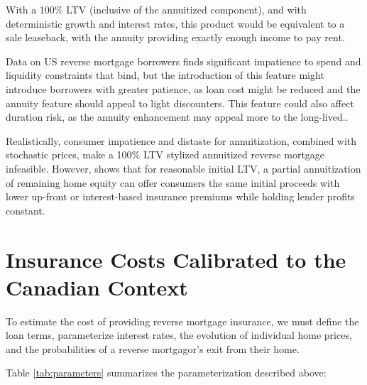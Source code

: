 \documentclass[12pt]{article}
\begin{document}
With a 100\% LTV (inclusive of the annuitized component), and with
deterministic growth and interest rates, this product would be equivalent to a
sale leaseback, with the annuity providing exactly enough income to pay rent.

Data on US reverse mortgage borrowers finds significant impatience to spend
and liquidity constraints that bind, but the introduction of this feature might
introduce borrowers with greater patience, as loan cost might be reduced and
the annuity feature should appeal to light discounters. This feature could also
affect duration risk, as the annuity enhancement may appeal more to the
long-lived..


Realistically, consumer impatience and distaste for annuitization, combined
with stochastic prices, make a 100\% LTV stylized annuitized reverse mortgage
infeasible. However, \textcite{DavidoffBrookings} shows that for reasonable
initial LTV, a partial annuitization of remaining home equity can offer
consumers the same initial proceeds with lower up-front or interest-based
insurance premiums while holding lender profits constant.

\section{\label{sec:results} Insurance Costs Calibrated to the Canadian Context}

To estimate the cost of providing reverse mortgage insurance, we must define
the loan terms, parameterize interest rates, the evolution of individual home
prices, and the probabilities of a reverse mortgagor's exit from their home.

Table \ref{tab:parameters} summarizes the parameterization described above:
\end{document}
